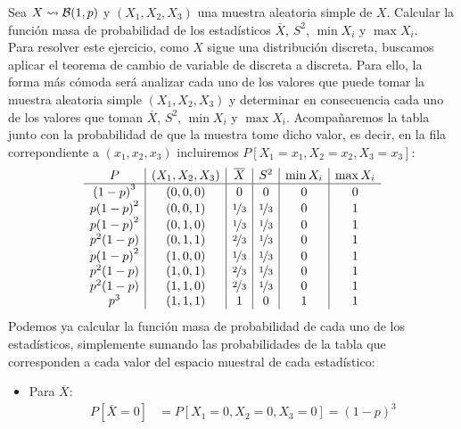 \begin{ejercicio}
   Sea $X\rightsquigarrow \mathcal{B}(1,p)$ y $(X_1, X_2, X_3)$ una muestra aleatoria simple de $X$. Calcular la función masa de probabilidad de los estadísticos $\overline{X}$, $S^2$, $\min X_i$ y $\max X_i$.\\

   \noindent
   Para resolver este ejercicio, como $X$ sigue una distribución discreta, buscamos aplicar el teorema de cambio de variable de discreta a discreta. Para ello, la forma más cómoda será analizar cada uno de los valores que puede tomar la muestra aleatoria simple $(X_1, X_2, X_3)$ y determinar en consecuencia cada uno de los valores que toman $\overline{X}$, $S^2$, $\min X_i$ y $\max X_i$. Acompañaremos la tabla junto con la probabilidad de que la muestra tome dicho valor, es decir, en la fila correpondiente a $(x_1, x_2, x_3)$ incluiremos $P[X_1 = x_1, X_2 = x_2, X_3 = x_3]$:
   \begin{equation*}
   \begin{array}{c|c|c|c|c|c}
       P & (X_1, X_2, X_3) & \overline{X} & S^2 & \min X_i & \max X_i  \\
       \hline
       {(1-p)}^{3} & (0,0,0) & 0 & 0 & 0 & 0 \\
       p{(1-p)}^{2} & (0,0,1) & \nicefrac{1}{3} & \nicefrac{1}{3} & 0 & 1 \\
       p{(1-p)}^{2} & (0,1,0) & \nicefrac{1}{3} & \nicefrac{1}{3} & 0 & 1 \\
       p^2(1-p) & (0,1,1) & \nicefrac{2}{3} & \nicefrac{1}{3} & 0 & 1 \\
       p{(1-p)}^{2} & (1,0,0) & \nicefrac{1}{3} & \nicefrac{1}{3} & 0 & 1 \\
       p^2(1-p) & (1,0,1) & \nicefrac{2}{3} & \nicefrac{1}{3} & 0 & 1 \\
       p^2(1-p) & (1,1,0) & \nicefrac{2}{3} & \nicefrac{1}{3} & 0 & 1 \\
       p^3 & (1,1,1) & 1 & 0 & 1 & 1 
   \end{array}
   \end{equation*}
   Podemos ya calcular la función masa de probabilidad de cada uno de los estadísticos, simplemente sumando las probabilidades de la tabla que corresponden a cada valor del espacio muestral de cada estadístico:
   \begin{itemize}
       \item Para $\overline{X}$:
           \begin{align*}
               P[\overline{X} = 0] &= P[X_1 = 0, X_2 = 0, X_3=0] = {(1-p)}^{3}  \\

\end{align*}
\end{itemize}
\end{ejercicio}
